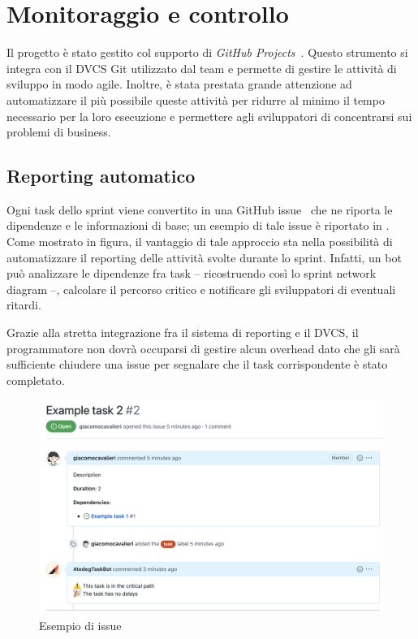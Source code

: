 \chapter{Monitoraggio e controllo}
\label{ch:monitoraggio-e-controllo}

Il progetto è stato gestito col supporto di \emph{GitHub Projects}~\cite{cit:github-projects}. Questo strumento si integra con il DVCS Git utilizzato dal team e permette di gestire le attività di sviluppo in modo agile.
Inoltre, è stata prestata grande attenzione ad automatizzare il più possibile queste attività per ridurre al minimo il tempo necessario per la loro esecuzione e permettere agli sviluppatori di concentrarsi sui problemi di business.

\section{Reporting automatico}
\label{sec:reporting-automatico}

Ogni task dello sprint viene convertito in una GitHub issue~\cite{cit:github-issues} che ne riporta le dipendenze e le informazioni di base; un esempio di tale issue è riportato in . Come mostrato in figura, il vantaggio di tale approccio sta nella possibilità di automatizzare il reporting delle attività svolte durante lo sprint. Infatti, un bot può analizzare le dipendenze fra task -- ricostruendo così lo sprint network diagram --, calcolare il percorso critico e notificare gli sviluppatori di eventuali ritardi.

Grazie alla stretta integrazione fra il sistema di reporting e il DVCS, il programmatore non dovrà occuparsi di gestire alcun overhead dato che gli sarà sufficiente chiudere una issue per segnalare che il task corrispondente è stato completato.

\begin{figure}[htp]
  \centering
  \includegraphics[width=\textwidth]{images/task-example.png}
  \caption{Esempio di issue}
  \label{fig:issue-example}
\end{figure}

